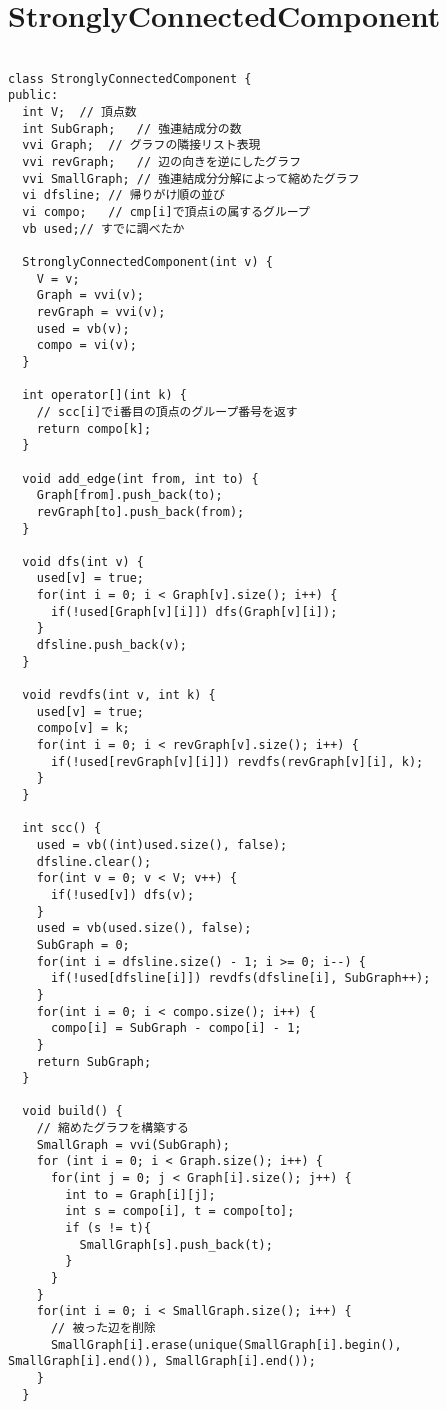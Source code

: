\documentclass[a4j,titlepage]{jarticle} %
\begin{document}
\section{StronglyConnectedComponent}
\color{black}
\begin{lstlisting}[caption=StronglyConnectedComponent]

class StronglyConnectedComponent {
public:
  int V;  // 頂点数
  int SubGraph;   // 強連結成分の数
  vvi Graph;  // グラフの隣接リスト表現
  vvi revGraph;   // 辺の向きを逆にしたグラフ
  vvi SmallGraph; // 強連結成分分解によって縮めたグラフ
  vi dfsline; // 帰りがけ順の並び
  vi compo;   // cmp[i]で頂点iの属するグループ
  vb used;// すでに調べたか

  StronglyConnectedComponent(int v) {
    V = v;
    Graph = vvi(v);
    revGraph = vvi(v);
    used = vb(v);
    compo = vi(v);
  }

  int operator[](int k) {
    // scc[i]でi番目の頂点のグループ番号を返す
    return compo[k];
  }

  void add_edge(int from, int to) {
    Graph[from].push_back(to);
    revGraph[to].push_back(from);
  }

  void dfs(int v) {
    used[v] = true;
    for(int i = 0; i < Graph[v].size(); i++) {
      if(!used[Graph[v][i]]) dfs(Graph[v][i]);
    }
    dfsline.push_back(v);
  }

  void revdfs(int v, int k) {
    used[v] = true;
    compo[v] = k;
    for(int i = 0; i < revGraph[v].size(); i++) {
      if(!used[revGraph[v][i]]) revdfs(revGraph[v][i], k);
    }
  }

  int scc() {
    used = vb((int)used.size(), false);
    dfsline.clear();
    for(int v = 0; v < V; v++) {
      if(!used[v]) dfs(v);
    }
    used = vb(used.size(), false);
    SubGraph = 0;
    for(int i = dfsline.size() - 1; i >= 0; i--) {
      if(!used[dfsline[i]]) revdfs(dfsline[i], SubGraph++);
    }
    for(int i = 0; i < compo.size(); i++) {
      compo[i] = SubGraph - compo[i] - 1;
    }
    return SubGraph;
  }

  void build() {
    // 縮めたグラフを構築する
    SmallGraph = vvi(SubGraph);
    for (int i = 0; i < Graph.size(); i++) {
      for(int j = 0; j < Graph[i].size(); j++) {
        int to = Graph[i][j];
        int s = compo[i], t = compo[to];
        if (s != t){
          SmallGraph[s].push_back(t);
        }
      }
    }
    for(int i = 0; i < SmallGraph.size(); i++) {
      // 被った辺を削除
      SmallGraph[i].erase(unique(SmallGraph[i].begin(), SmallGraph[i].end()), SmallGraph[i].end());
    }
  }


\end{lstlisting}
\end{document}

